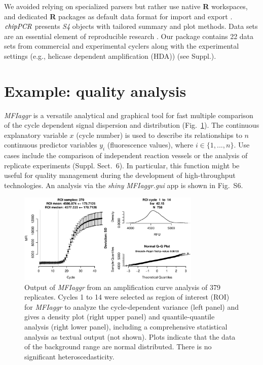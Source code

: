 \documentclass{bioinfo}
\begin{document}
\begin{methods}
We avoided relying on specialized parsers but rather use native \textbf{R} 
workspaces, and dedicated \textbf{R} packages as default data format for import 
and export \citep{perkins_2012,blagodatskikh_2014,RCT_2013}. 
$\emph{chipPCR}$ presents \emph{S4} objects with tailored summary and plot 
methods. Data sets are an essential element of reproducible research 
\citep{Leeper_2014}. Our package contains 22 data sets from commercial and 
experimental cyclers along with the experimental settings (e.g., helicase 
dependent amplification (HDA)) (see Suppl.). %
\end{methods}

\section{Example: quality analysis}

\textsl{MFIaggr} is a versatile analytical and graphical tool for fast multiple 
comparison of the cycle dependent signal dispersion and distribution 
(Fig.~\ref{fig:01}). The continuous explanatory variable $x$ (cycle number) is 
used to describe its relationships to $n$ continuous predictor variables $y_i$ 
(fluorescence values), where $i \in \{1, ..., n\}$. Use cases include the 
comparison of independent reaction vessels or 
the analysis of replicate experiments (Suppl. Sect.~6). In %
particular, this function might be useful for quality management during the 
development of high-throughput technologies. An analysis via the \emph{shiny} 
\textsl{MFIaggr.gui} app is shown in Fig.~S6. %

\begin{figure}[!tpb]%
\centerline{\includegraphics[width=8.7cm]{fig01.eps}}
\caption{Output of \textsl{MFIaggr} from an amplification curve analysis of 379 replicates. Cycles 1 to 14 were 
selected as region of interest (ROI) for \textsl{MFIaggr} to analyze the 
cycle-dependent variance (left panel) and gives a density plot (right upper 
panel) and quantile-quantile analysis (right lower panel), including a 
comprehensive statistical analysis as textual output (not shown). Plots 
indicate that the data of the background range are normal 
distributed. There is no significant heteroscedasticity.}\label{fig:01}
\end{figure}
\end{document}
